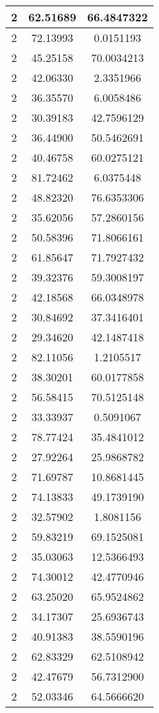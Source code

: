 \documentclass[
]{book}
\begin{document}
\begin{tabular}{c|c|c}
\hline
2 & 62.51689 & 66.4847322\\
\hline
2 & 72.13993 & 0.0151193\\
\hline
2 & 45.25158 & 70.0034213\\
\hline
2 & 42.06330 & 2.3351966\\
\hline
2 & 36.35570 & 6.0058486\\
\hline
2 & 30.39183 & 42.7596129\\
\hline
2 & 36.44900 & 50.5462691\\
\hline
2 & 40.46758 & 60.0275121\\
\hline
2 & 81.72462 & 6.0375448\\
\hline
2 & 48.82320 & 76.6353306\\
\hline
2 & 35.62056 & 57.2860156\\
\hline
2 & 50.58396 & 71.8066161\\
\hline
2 & 61.85647 & 71.7927432\\
\hline
2 & 39.32376 & 59.3008197\\
\hline
2 & 42.18568 & 66.0348978\\
\hline
2 & 30.84692 & 37.3416401\\
\hline
2 & 29.34620 & 42.1487418\\
\hline
2 & 82.11056 & 1.2105517\\
\hline
2 & 38.30201 & 60.0177858\\
\hline
2 & 56.58415 & 70.5125148\\
\hline
2 & 33.33937 & 0.5091067\\
\hline
2 & 78.77424 & 35.4841012\\
\hline
2 & 27.92264 & 25.9868782\\
\hline
2 & 71.69787 & 10.8681445\\
\hline
2 & 74.13833 & 49.1739190\\
\hline
2 & 32.57902 & 1.8081156\\
\hline
2 & 59.83219 & 69.1525081\\
\hline
2 & 35.03063 & 12.5366493\\
\hline
2 & 74.30012 & 42.4770946\\
\hline
2 & 63.25020 & 65.9524862\\
\hline
2 & 34.17307 & 25.6936743\\
\hline
2 & 40.91383 & 38.5590196\\
\hline
2 & 62.83329 & 62.5108942\\
\hline
2 & 42.47679 & 56.7312900\\
\hline
2 & 52.03346 & 64.5666620\\

\end{tabular}
\end{document}
